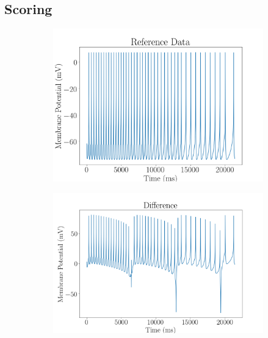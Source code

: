 \subsection{Scoring}
\begin{figure}[h!]\label{score}
	\begin{subfigure}{.33\textwidth}
		\centering
		\includegraphics[scale=0.20]{Figures/reference.png}
		\caption{}
		\label{ref}
	\end{subfigure}
	\begin{subfigure}{.33\textwidth}
		\centering
		\includegraphics[scale=0.20]{Figures/difference.png}
		\caption{}
		\label{diff}
	\end{subfigure}
	\begin{subfigure}{.33\textwidth}
		\centering

\end{subfigure}
\end{figure}
